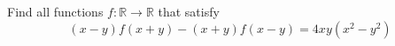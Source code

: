 Find all functions $f : \mathbb{R} \longrightarrow \mathbb{R}$ that satisfy
\[ (x - y)f(x + y) - (x + y)f(x - y) = 4xy(x^2 - y^2)  \]